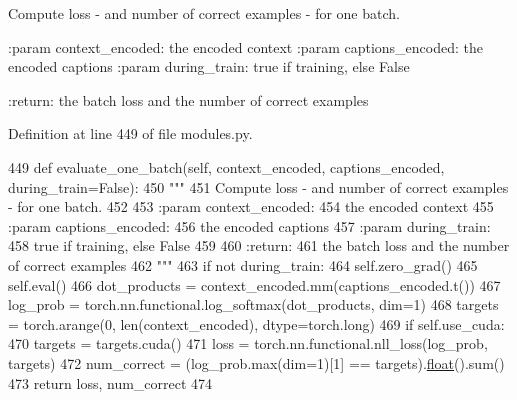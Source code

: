 \begin{DoxyVerb}Compute loss - and number of correct examples - for one batch.

:param context_encoded:
    the encoded context
:param captions_encoded:
    the encoded captions
:param during_train:
    true if training, else False

:return:
    the batch loss and the number of correct examples
\end{DoxyVerb}
 

Definition at line 449 of file modules.\+py.


\begin{DoxyCode}
449     \textcolor{keyword}{def }evaluate\_one\_batch(self, context\_encoded, captions\_encoded, during\_train=False):
450         \textcolor{stringliteral}{"""}
451 \textcolor{stringliteral}{        Compute loss - and number of correct examples - for one batch.}
452 \textcolor{stringliteral}{}
453 \textcolor{stringliteral}{        :param context\_encoded:}
454 \textcolor{stringliteral}{            the encoded context}
455 \textcolor{stringliteral}{        :param captions\_encoded:}
456 \textcolor{stringliteral}{            the encoded captions}
457 \textcolor{stringliteral}{        :param during\_train:}
458 \textcolor{stringliteral}{            true if training, else False}
459 \textcolor{stringliteral}{}
460 \textcolor{stringliteral}{        :return:}
461 \textcolor{stringliteral}{            the batch loss and the number of correct examples}
462 \textcolor{stringliteral}{        """}
463         \textcolor{keywordflow}{if} \textcolor{keywordflow}{not} during\_train:
464             self.zero\_grad()
465             self.eval()
466         dot\_products = context\_encoded.mm(captions\_encoded.t())
467         log\_prob = torch.nn.functional.log\_softmax(dot\_products, dim=1)
468         targets = torch.arange(0, len(context\_encoded), dtype=torch.long)
469         \textcolor{keywordflow}{if} self.use\_cuda:
470             targets = targets.cuda()
471         loss = torch.nn.functional.nll\_loss(log\_prob, targets)
472         num\_correct = (log\_prob.max(dim=1)[1] == targets).\hyperlink{namespaceprojects_1_1controllable__dialogue_1_1make__control__dataset_aa2b7207688c641dbc094ab44eca27113}{float}().sum()
473         \textcolor{keywordflow}{return} loss, num\_correct
474 
\end{DoxyCode}
\mbox{\label{classprojects_1_1personality__captions_1_1transresnet_1_1modules_1_1TransresnetModel_a1a0d7d70271cf1cb881f3166bfd7bf10}} 
